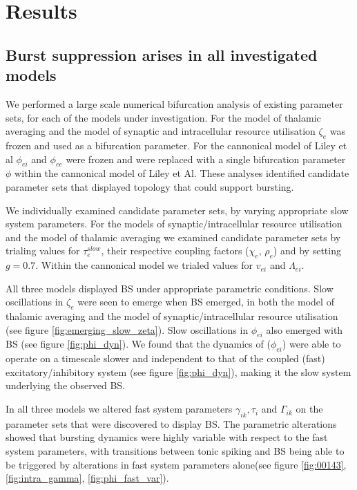 \documentclass[a4paper,12pt]{article}
\begin{document}
\section{Results}

\subsection{Burst suppression arises in all investigated models}
We performed a large scale numerical bifurcation analysis of existing parameter sets, for each of the models under investigation. For the model of thalamic averaging and the model of synaptic and intracellular resource utilisation $\zeta_e$ was frozen and used as a bifurcation parameter. For the cannonical model of Liley et al $\phi_{ei}$ and $\phi_{ee}$ were frozen and were replaced with a single bifurcation parameter $\phi$ within the cannonical model of Liley et Al. These analyses identified candidate parameter sets that displayed topology that could support bursting.

We individually examined candidate parameter sets, by varying appropriate slow system parameters. For the models of synaptic/intracellular resource utilisation and the model of thalamic averaging we examined candidate parameter sets by trialing values for $\tau^{slow}_e$, their respective coupling factors ($\chi_{e}$, $\rho_{e}$) and by setting $g=0.7$. Within the cannonical model we trialed values for $v_{ei}$ and $\Lambda_{ei}$.

All three models displayed BS under appropriate parametric conditions. Slow oscillations in $\zeta_e$ were seen to emerge when BS emerged, in both the model of thalamic averaging and the model of synaptic/intracellular resource utilisation (see figure \ref{fig:emerging_slow_zeta}). Slow oscillations in $\phi_{ei}$ also emerged with BS (see figure \ref{fig:phi_dyn}). We found that the dynamics of ($\phi_{ei}$) were able to operate on a timescale slower and independent to that of the coupled (fast)
excitatory/inhibitory system (see figure \ref{fig:phi_dyn}), making it the slow system underlying the observed BS.

In all three models we altered fast system parameters $\gamma_{ik}, \tau_i$ and $\Gamma_{ik}$ on the parameter sets that were discovered to display BS.  The parametric alterations showed that bursting dynamics were highly variable with respect to the fast system parameters, with transitions between tonic spiking and BS being able to be triggered by alterations in fast system parameters alone(see figure \ref{fig:00143}, \ref{fig:intra_gamma}, \ref{fig:phi_fast_var}).
\end{document}
